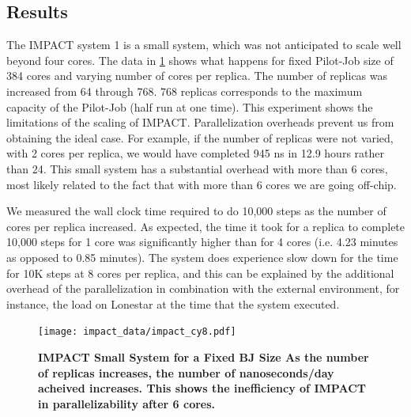 \documentclass{sig-alternate}
\begin{document}

\subsection{Results}

The IMPACT system 1 is a small system, which was not anticipated to scale well beyond four cores. The data in \ref{fig:impact_cy8} shows what happens for fixed Pilot-Job size of 384 cores and varying number of cores per replica. The number of replicas was increased from 64 through 768. 768 replicas corresponds to the maximum capacity of the Pilot-Job (half run at one time). This experiment shows the limitations of the scaling of IMPACT. Parallelization overheads prevent us from obtaining the ideal case. For example, if the number of replicas were not varied, with 2 cores per replica, we would have completed 945 ns in 12.9 hours rather than 24. This small system has a substantial overhead with more than 6 cores, most likely related to the fact that with more than 6 cores we are going off-chip. 

We measured the wall clock time required to do 10,000 steps as the number of cores per replica increased. As expected, the time it took for a replica to complete 10,000 steps for 1 core was significantly higher than for 4 cores (i.e. 4.23 minutes as opposed to 0.85 minutes). The system does experience slow down for the time for 10K steps at 8 cores per replica, and this can be explained by the additional overhead of the parallelization in combination with the external environment, for instance, the load on Lonestar at the time that the system executed.

\begin{figure}[t]
	\centering
		\texttt{[image: impact\_data/impact\_cy8.pdf]}
	\caption{\textbf{IMPACT Small System for a Fixed BJ Size As the number of replicas  
                      increases, the number of nanoseconds/day acheived increases. This shows the inefficiency of IMPACT in parallelizability after 6 cores.}}
	\label{fig:impact_cy8}
\end{figure}
\end{document}
